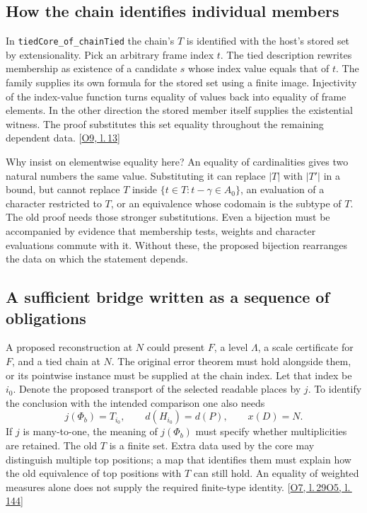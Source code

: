 \documentclass[12pt,letterpaper]{article}
\newcommand{\id}[1]{{\small\nolinkurl{#1}}}
\begin{document}
\subsection{How the chain identifies individual members}
In \id{tiedCore_of_chainTied} the chain's $T$ is identified with the host's stored set by extensionality. Pick an arbitrary frame index $t$. The tied description rewrites membership as existence of a candidate $s$ whose index value equals that of $t$. The family supplies its own formula for the stored set using a finite image. Injectivity of the index-value function turns equality of values back into equality of frame elements. In the other direction the stored member itself supplies the existential witness. The proof substitutes this set equality throughout the remaining dependent data.  {\footnotesize\sffamily\color{mute}[\href{https://github.com/nousentllc/riemann-hypothesis/blob/40e56bab026552e089d7afcfeff08d2defb9c005/src/Development/AutomorphicArithmetic/PrimitiveCosets/LevelGmLeOnFamilyScales.lean\#L13}{O9, l.\,13}]}

Why insist on elementwise equality here? An equality of cardinalities gives two natural numbers the same value. Substituting it can replace $|T|$ with $|T'|$ in a bound, but cannot replace $T$ inside $\{t\in T:t-\gamma\in A_0\}$, an evaluation of a character restricted to $T$, or an equivalence whose codomain is the subtype of $T$. The old proof needs those stronger substitutions. Even a bijection must be accompanied by evidence that membership tests, weights and character evaluations commute with it. Without these, the proposed bijection rearranges the data on which the statement depends.

\subsection{A sufficient bridge written as a sequence of obligations}
A proposed reconstruction at $N$ could present $F$, a level $\Lambda$, a scale certificate for $F$, and a tied chain at $N$. The original error theorem must hold alongside them, or its pointwise instance must be supplied at the chain index. Let that index be $i_0$. Denote the proposed transport of the selected readable places by $j$. To identify the conclusion with the intended comparison one also needs
\[
 j(\Phi_b)=T_{i_0},\qquad d(H_{i_0})=d(P),\qquad
       x(D)=N.
\]
If $j$ is many-to-one, the meaning of $j(\Phi_b)$ must specify whether multiplicities are retained. The old $T$ is a finite set. Extra data used by the core may distinguish multiple top positions; a map that identifies them must explain how the old equivalence of top positions with $T$ can still hold. An equality of weighted measures alone does not supply the required finite-type identity.  {\footnotesize\sffamily\color{mute}[\href{https://github.com/nousentllc/riemann-hypothesis/blob/40e56bab026552e089d7afcfeff08d2defb9c005/src/Development/AutomorphicArithmetic/PrimitiveCosets/CoreAtH.lean\#L29}{O7, l.\,29}\enspace \href{https://github.com/nousentllc/riemann-hypothesis/blob/40e56bab026552e089d7afcfeff08d2defb9c005/src/Formalism/SharpRestriction/RamificationFrobenius/TotientGaloisClasses/ExplicitFormulaErrorOfHostConditions.lean\#L144}{O5, l.\,144}]}
\end{document}

